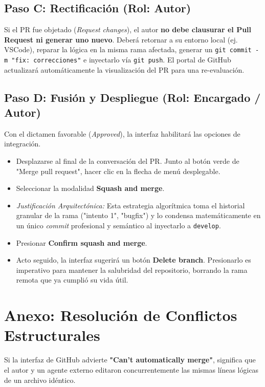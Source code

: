 \documentclass[12pt, a4paper]{article}
\begin{document}
\subsection{Paso C: Rectificación (Rol: Autor)}
Si el PR fue objetado (\textit{Request changes}), el autor \textbf{no debe clausurar el Pull Request ni generar uno nuevo}.
Deberá retornar a su entorno local (ej. VSCode), reparar la lógica en la misma rama afectada, generar un \texttt{git commit -m "fix: correcciones"} e inyectarlo vía \texttt{git push}. El portal de GitHub actualizará automáticamente la visualización del PR para una re-evaluación.

\subsection{Paso D: Fusión y Despliegue (Rol: Encargado / Autor)}
Con el dictamen favorable (\textit{Approved}), la interfaz habilitará las opciones de integración.
\begin{itemize}
    \item Desplazarse al final de la conversación del PR. Junto al botón verde de "Merge pull request", hacer clic en la flecha de menú desplegable.
    \item Seleccionar la modalidad \textbf{Squash and merge}.
    \item \textit{Justificación Arquitectónica:} Esta estrategia algorítmica toma el historial granular de la rama ("intento 1", "bugfix") y lo condensa matemáticamente en un único \textit{commit} profesional y semántico al inyectarlo a \texttt{develop}.
    \item Presionar \textbf{Confirm squash and merge}.
    \item Acto seguido, la interfaz sugerirá un botón \textbf{Delete branch}. Presionarlo es imperativo para mantener la salubridad del repositorio, borrando la rama remota que ya cumplió su vida útil.
\end{itemize}

\section{Anexo: Resolución de Conflictos Estructurales}
Si la interfaz de GitHub advierte \textbf{"Can't automatically merge"}, significa que el autor y un agente externo editaron concurrentemente las mismas líneas lógicas de un archivo idéntico.
\end{document}
